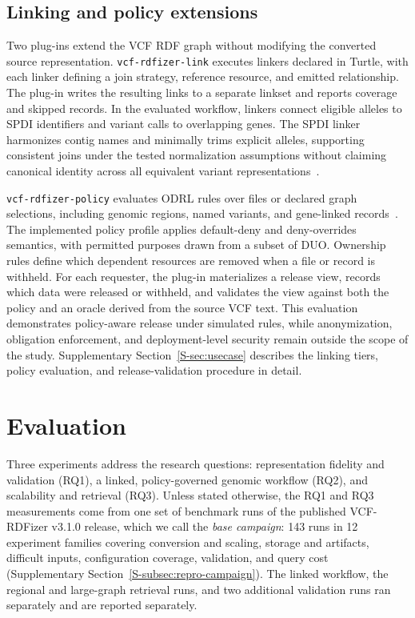 \documentclass[pdflatex,sn-mathphys-num]{sn-jnl}
\begin{document}
\subsection{Linking and policy extensions}\label{subsec:extensions}
Two plug-ins extend the VCF RDF graph without modifying the converted source representation.
\texttt{vcf-rdfizer-link} executes linkers declared in Turtle, with each linker defining a join strategy, reference resource, and emitted relationship.
The plug-in writes the resulting links to a separate linkset and reports coverage and skipped records.
In the evaluated workflow, linkers connect eligible alleles to SPDI identifiers and variant calls to overlapping genes.
The SPDI linker harmonizes contig names and minimally trims explicit alleles, supporting consistent joins under the tested normalization assumptions without claiming canonical identity across all equivalent variant representations~\cite{holmes2020spdi}.

\texttt{vcf-rdfizer-policy} evaluates ODRL rules over files or declared graph selections, including genomic regions, named variants, and gene-linked records~\cite{odrl_2018,lawson2021duo}.
The implemented policy profile applies default-deny and deny-overrides semantics, with permitted purposes drawn from a subset of DUO.
Ownership rules define which dependent resources are removed when a file or record is withheld.
For each requester, the plug-in materializes a release view, records which data were released or withheld, and validates the view against both the policy and an oracle derived from the source VCF text.
This evaluation demonstrates policy-aware release under simulated rules, while anonymization, obligation enforcement, and deployment-level security remain outside the scope of the study.
Supplementary Section~\ref{S-sec:usecase} describes the linking tiers, policy evaluation, and release-validation procedure in detail.

\section{Evaluation}\label{sec:evaluation}
Three experiments address the research questions: representation fidelity and validation (RQ1), a linked, policy-governed genomic workflow (RQ2), and scalability and retrieval (RQ3).
Unless stated otherwise, the RQ1 and RQ3 measurements come from one set of benchmark runs of the published VCF-RDFizer v3.1.0 release, which we call the \emph{base campaign}: 143 runs in 12 experiment families covering conversion and scaling, storage and artifacts, difficult inputs, configuration coverage, validation, and query cost (Supplementary Section~\ref{S-subsec:repro-campaign}).
The linked workflow, the regional and large-graph retrieval runs, and two additional validation runs ran separately and are reported separately.
\end{document}
